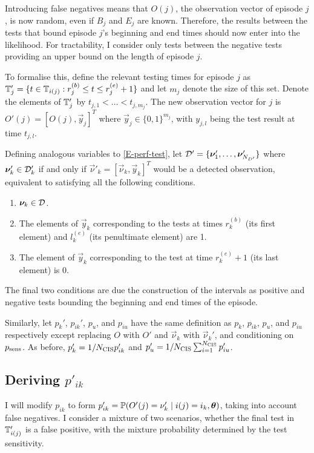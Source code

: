 \documentclass[thesis.tex]{subfiles}
\begin{document}
Introducing false negatives means that $O(j)$, the observation vector of episode $j$, is now random, even if $B_j$ and $E_j$ are known.
Therefore, the results between the tests that bound episode $j$'s beginning and end times should now enter into the likelihood.
For tractability, I consider only tests between the negative tests providing an upper bound on the length of episode $j$.

To formalise this, define the relevant testing times for episode $j$ as $\mathbb{T}'_j = \{ t \in \mathbb{T}_{i(j)} : r_j^{(b)} \leq t \leq r_j^{(e)} + 1 \}$ and let $m_j$ denote the size of this set.
Denote the elements of $\mathbb{T}'_j$ by $t_{j,1} < \dots < t_{j,m_j}$.
The new observation vector for $j$ is $O'(j) = [O(j), \vec{y}_j]^T$ where $\vec{y}_j \in \{ 0, 1 \}^{m_j}$, with $y_{j,l}$ being the test result at time $t_{j,l}$.


Defining analogous variables to \cref{E-perf-test}, let $\mathcal{D}' = \{ \bm{\nu}'_1, \dots, \bm{\nu}'_{N_{D'}} \}$ where $\bm{\nu}'_k \in \mathcal{D}'_k$ if and only if $\vec{\nu}'_k = [\vec{\nu}_k, \vec{y}_k]^T$ would be a detected observation, equivalent to satisfying all the following conditions.
\begin{enumerate}
  \item $\bm{\nu}_k \in \mathcal{D}$.
  \item The elements of $\vec{y}_k$ corresponding to the tests at times $r_k^{(b)}$ (its first element) and $l_k^{(e)}$ (its penultimate element) are 1.
  \item The element of $\vec{y}_k$ corresponding to the test at time $r_k^{(e)} + 1$ (its last element) is 0.
\end{enumerate}
The final two conditions are due the construction of the intervals as positive and negative tests bounding the beginning and end times of the episode.

Similarly, let $p_k'$, $p_{ik}'$, $p_u$, and $p_{iu}$ have the same definition as $p_k$, $p_{ik}$, $p_u$, and $p_{iu}$ respectively except replacing $O$ with $O'$ and $\vec{\nu}_k$ with $\vec{\nu}_k'$, and conditioning on $p_\text{sens}$.
As before, $p'_k = 1/N_\text{CIS} p'_{ik}$ and $p'_u = 1/N_\text{CIS} \sum_{i=1}^{N_\text{CIS}} p'_{iu}$.

\subsection{Deriving $p'_{ik}$} \label{imperf-test:sec:modifying-p_ia}

I will modify $p_{ik}$ to form $p_{ik}' = \operatorname{\mathbb{P}}(O'(j) = \nu'_k \mid i(j) = i_k, \bm{\theta})$, taking into account false negatives.
I consider a mixture of two scenarios, whether the final test in $\mathbb{T}'_{i(j)}$ is a false positive, with the mixture probability determined by the test sensitivity.
\end{document}
